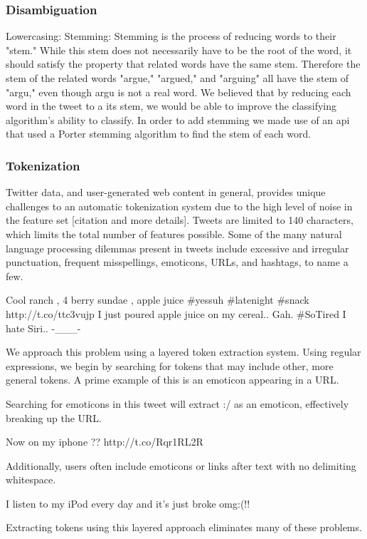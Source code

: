 \documentclass[letterpaper]{article}
\begin{document}
\subsubsection{Disambiguation}
Lowercasing:
Stemming: Stemming is the process of reducing words to their "stem." While this stem does not necessarily have to be the root of the word, it should satisfy the property that related words have the same stem. Therefore the stem of the related words "argue," "argued," and "arguing" all have the stem of "argu," even though argu is not a real word. We believed that by reducing each word in the tweet to a its stem, we would be able to improve the classifying algorithm's ability to classify. In order to add stemming we made use of an api that used a Porter stemming algorithm to find the stem of each word.

\subsubsection{Tokenization}
Twitter data, and user-generated web content in general, provides unique challenges to an automatic tokenization system due to the high level of noise in the feature set [citation and more details]. Tweets are limited to 140 characters, which limits the total number of features possible. Some of the many natural language processing dilemmas present in tweets include excessive and irregular punctuation, frequent misspellings, emoticons, URLs, and hashtags, to name a few.

Cool ranch , 4 berry sundae , apple juice \#yessuh \#latenight \#snack http://t.co/ttc3vujp 
I just poured apple juice on my cereal.. Gah. \#SoTired 
I hate Siri.. -\_\_\_- 

We approach this problem using a layered token extraction system. Using regular expressions, we begin by searching for tokens that may include other, more general tokens. A prime example of this is an emoticon appearing in a URL.

Searching for emoticons in this tweet will extract :/ as an emoticon, effectively breaking up the URL.

Now on my iphone ?? http://t.co/Rqr1RL2R 

Additionally, users often include emoticons or links after text with no delimiting whitespace. 

I listen to my iPod every day and it's just broke omg:(!!

Extracting tokens using this layered approach eliminates many of these problems.
\end{document}
